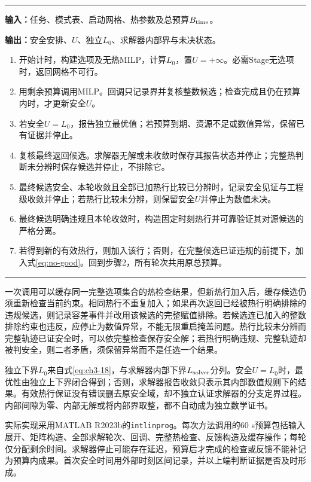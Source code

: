 \begin{table}[htbp]
\caption{连续热约束反馈求解步骤}\label{alg:milp}
\centering\small
\begin{minipage}{0.95\linewidth}
\hrule\medskip
\textbf{输入：}任务、模式表、启动网格、热参数及总预算$B_{\rm time}$。\par
\textbf{输出：}安全安排、$U$、独立$L_0$、求解器内部界与未决状态。
\begin{enumerate}
\setlength{\itemsep}{2pt}
\item 开始计时，构建选项及无热MILP，计算$L_0$，置$U=+\infty$。必需Stage无选项时，返回网格不可行。
\item 用剩余预算调用MILP。回调只记录界并复核整数候选；检查完成且仍在预算内时，才更新安全$U$。
\item 若安全$U=L_0$，报告独立最优值；若预算到期、资源不足或数值异常，保留已有证据并停止。
\item 复核最终返回候选。求解器无解或未收敛时保存其报告状态并停止；完整热判断未分辨时保存候选并停止，不排除它。
\item 最终候选安全、本轮收敛且全部已加热行比较已分辨时，记录安全见证与工程级收敛并停止；若热行比较未分辨，则保留安全$U$并停止为数值未决。
\item 最终候选明确违规且本轮收敛时，构造固定时刻热行并可靠验证其对源候选的严格分离。
\item 若得到新的有效热行，则加入该行；否则，在完整候选已证违规的前提下，加入式\eqref{eq:no-good}。回到步骤2，所有轮次共用原总预算。
\end{enumerate}
\hrule
\end{minipage}
\end{table}

一次调用可以缓存同一完整选项集合的热检查结果，但新热行加入后，缓存候选仍须重新检查当前约束。相同热行不重复加入；如果再次返回已经被热行明确排除的违规候选，则记录容差事件并改用该候选的完整赋值排除。若候选连已加入的整数排除约束也违反，应停止为数值异常，不能无限重启掩盖问题。热行比较未分辨而完整轨迹已证安全时，可以依完整检查保存安全解；若热行明确违规、完整轨迹却被判安全，则二者矛盾，须保留异常而不是任选一个结果。

独立下界$L_0$来自式\eqref{eq:ch3-18}，与求解器内部下界$L_{\rm solver}$分列。安全$U=L_0$时，最优性由独立上下界闭合得到；否则，求解器报告收敛只表示其内部数值规则下的结果。有效热行保证没有错误删去原安全域，却不独立认证求解器的分支定界过程。内部间隙为零、内部无解或将内部界取整，都不自动成为独立数学证书。

实际实现采用MATLAB R2023b的\texttt{intlinprog}\cite{mw-intlinprog,mw-callback}。每次方法调用的60 s预算包括输入展开、矩阵构造、全部求解轮次、回调、完整热检查、反馈构造及缓存操作；每轮仅分配剩余时间。求解器停止可能存在延迟，预算后才完成的检查或反馈不能补记为预算内成果。首次安全时间用外部时刻区间记录，并以上端判断证据是否及时形成。

